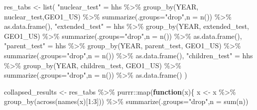 \documentclass[
]{book}
\newenvironment{Shaded}{\begin{snugshade}}{\end{snugshade}}
\newcommand{\AttributeTok}[1]{\textcolor[rgb]{0.77,0.63,0.00}{#1}}
\newcommand{\ControlFlowTok}[1]{\textcolor[rgb]{0.13,0.29,0.53}{\textbf{#1}}}
\newcommand{\DecValTok}[1]{\textcolor[rgb]{0.00,0.00,0.81}{#1}}
\newcommand{\FunctionTok}[1]{\textcolor[rgb]{0.00,0.00,0.00}{#1}}
\newcommand{\NormalTok}[1]{#1}
\newcommand{\OtherTok}[1]{\textcolor[rgb]{0.56,0.35,0.01}{#1}}
\newcommand{\SpecialCharTok}[1]{\textcolor[rgb]{0.00,0.00,0.00}{#1}}
\newcommand{\StringTok}[1]{\textcolor[rgb]{0.31,0.60,0.02}{#1}}
\begin{document}
\begin{Shaded}
\begin{Highlighting}[]
  
\NormalTok{  res\_tabs }\OtherTok{\textless{}{-}} \FunctionTok{list}\NormalTok{(}
    \StringTok{"nuclear\_test"} \OtherTok{=}\NormalTok{ hhs }\SpecialCharTok{\%\textgreater{}\%} \FunctionTok{group\_by}\NormalTok{(YEAR, nuclear\_test,GEO1\_US) }\SpecialCharTok{\%\textgreater{}\%} \FunctionTok{summarize}\NormalTok{(}\AttributeTok{.groups=}\StringTok{"drop"}\NormalTok{,}\AttributeTok{n =} \FunctionTok{n}\NormalTok{()) }\SpecialCharTok{\%\textgreater{}\%} \FunctionTok{as.data.frame}\NormalTok{(),}
  \StringTok{"extended\_test"} \OtherTok{=}\NormalTok{ hhs }\SpecialCharTok{\%\textgreater{}\%} \FunctionTok{group\_by}\NormalTok{(YEAR, extended\_test, GEO1\_US) }\SpecialCharTok{\%\textgreater{}\%} \FunctionTok{summarize}\NormalTok{(}\AttributeTok{.groups=}\StringTok{"drop"}\NormalTok{,}\AttributeTok{n =} \FunctionTok{n}\NormalTok{()) }\SpecialCharTok{\%\textgreater{}\%} \FunctionTok{as.data.frame}\NormalTok{(),}
  \StringTok{"parent\_test"} \OtherTok{=}\NormalTok{ hhs }\SpecialCharTok{\%\textgreater{}\%} \FunctionTok{group\_by}\NormalTok{(YEAR, parent\_test, GEO1\_US) }\SpecialCharTok{\%\textgreater{}\%} \FunctionTok{summarize}\NormalTok{(}\AttributeTok{.groups=}\StringTok{"drop"}\NormalTok{,}\AttributeTok{n =} \FunctionTok{n}\NormalTok{()) }\SpecialCharTok{\%\textgreater{}\%} \FunctionTok{as.data.frame}\NormalTok{(),}
  \StringTok{"children\_test"} \OtherTok{=}\NormalTok{ hhs }\SpecialCharTok{\%\textgreater{}\%} \FunctionTok{group\_by}\NormalTok{(YEAR, children\_test, GEO1\_US) }\SpecialCharTok{\%\textgreater{}\%} \FunctionTok{summarize}\NormalTok{(}\AttributeTok{.groups=}\StringTok{"drop"}\NormalTok{,}\AttributeTok{n =} \FunctionTok{n}\NormalTok{()) }\SpecialCharTok{\%\textgreater{}\%} \FunctionTok{as.data.frame}\NormalTok{()}
\NormalTok{  )}
  
  
  
  

\NormalTok{collapsed\_results }\OtherTok{\textless{}{-}}\NormalTok{ res\_tabs }\SpecialCharTok{\%\textgreater{}\%}\NormalTok{ purrr}\SpecialCharTok{::}\FunctionTok{map}\NormalTok{(}\ControlFlowTok{function}\NormalTok{(x)\{}
\NormalTok{  x }\OtherTok{\textless{}{-}}\NormalTok{ x }\SpecialCharTok{\%\textgreater{}\%} \FunctionTok{group\_by}\NormalTok{(}\FunctionTok{across}\NormalTok{(}\FunctionTok{names}\NormalTok{(x)[}\DecValTok{1}\SpecialCharTok{:}\DecValTok{3}\NormalTok{])) }\SpecialCharTok{\%\textgreater{}\%} \FunctionTok{summarize}\NormalTok{(}\AttributeTok{.groups=}\StringTok{"drop"}\NormalTok{,}\AttributeTok{n =} \FunctionTok{sum}\NormalTok{(n))}


\end{Highlighting}
\end{Shaded}
\end{document}
